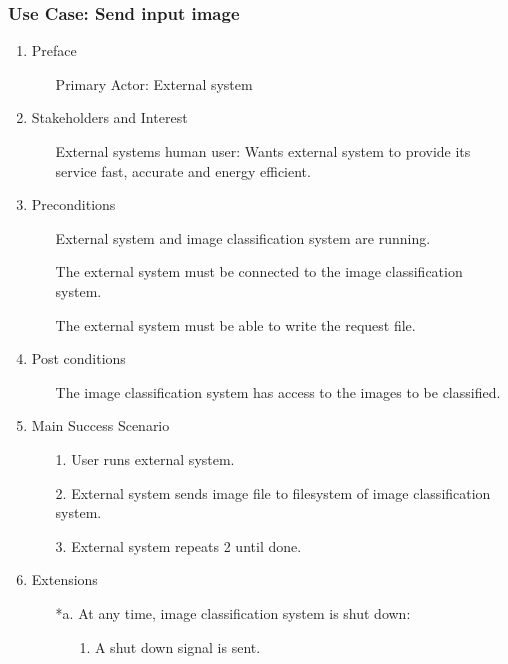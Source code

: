 \documentclass[parskip=full]{scrartcl}
\begin{document}
\pagebreak

\subsubsection {Use Case: Send input image} \label {uc:sip}

\begin{enumerate}
	\item Preface
	\begin{itemize} [nosep]
		\item[] Primary Actor: External system
	\end{itemize}
	\item Stakeholders and Interest
	\begin{itemize} [nosep]
		\item[] External systems human user: Wants external system to provide its service fast, accurate and energy efficient.
	\end{itemize}
	\item Preconditions
	\begin{itemize} [nosep]
		\item[] External system and image classification system are running.
		\item[] The external system must be connected to the image classification system.
		\item[] The external system must be able to write the request file.
	\end{itemize}
	\item Post conditions
	\begin{itemize} [nosep]
		\item[] The image classification system has access to the images to be classified.
	\end{itemize}
	\item Main Success Scenario
	\begin{itemize} [nosep]
		\item[1.] User runs external system.
		\item[2.] External system sends image file to filesystem of image classification system.
		\item[3.] External system repeats 2 until done.
	\end{itemize}
	\item Extensions
	\begin{itemize} [nosep]
		\item[*a.] At any time, image classification system is shut down:
		\begin{itemize} [nosep]
			\item[1.] A shut down signal is sent.
		\end{itemize}
	\end{itemize}
\end{enumerate}
\end{document}
